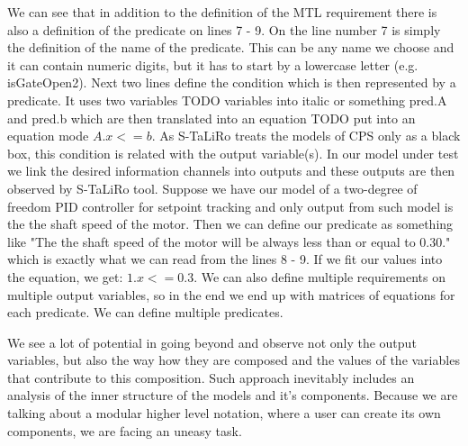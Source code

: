 

We can see that in addition to the definition of the MTL requirement there is also a definition of the predicate on lines 7 - 9. On the line number 7 is simply the definition of the name of the predicate. This can be any name we choose and it can contain numeric digits, but it has to start by a lowercase letter (e.g. isGateOpen2). Next two lines define the condition which is then represented by a predicate. It uses two variables TODO variables into italic or something pred.A and pred.b which are then translated into an equation TODO put into an equation mode $A.x <= b$. As S-TaLiRo treats the models of CPS only as a black box, this condition is related with the output variable(s). In our model under test we link the desired information channels into outputs and these outputs are then observed by S-TaLiRo tool. Suppose we have our model of a two-degree of freedom PID controller for setpoint tracking and only output from such model is the the shaft speed of the motor. Then we can define our predicate as something like "The the shaft speed of the motor will be always less than or equal to 0.30." which is exactly what we can read from the lines 8 - 9. If we fit our values into the equation, we get: $1.x <= 0.3$. We can also define multiple requirements on multiple output variables, so in the end we end up with matrices of equations for each predicate. We can define multiple predicates.

We see a lot of potential in going beyond and observe not only the output variables, but also the way how they are composed and the values of the variables that contribute to this composition. Such approach inevitably includes an analysis of the inner structure of the models and it's components. Because we are talking about a modular higher level notation, where a user can create its own components, we are facing an uneasy task.